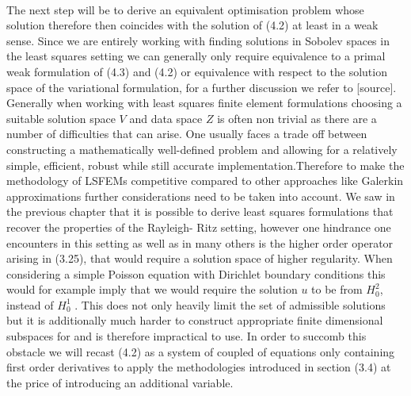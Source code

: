 \documentclass[../draft_1.tex]{subfiles}
\begin{document}
\smallskip
\\
The next step will be to derive an equivalent optimisation problem whose solution therefore then coincides with the solution of (4.2) at least in a weak sense. Since we are entirely working with finding solutions in Sobolev spaces in the least squares setting we can generally only require equivalence to a primal weak formulation of (4.3) and (4.2) or equivalence with respect to the solution space of the variational formulation, for a further discussion we refer to [source]. Generally when working with least squares finite element formulations choosing a suitable solution space $V$ and data space $Z$ is often non trivial as there are a number of difficulties that can arise. One usually faces a trade off between constructing a mathematically well-defined problem and allowing for a relatively simple, efficient, robust while still accurate implementation.Therefore to make the methodology of LSFEMs competitive compared to other approaches like Galerkin approximations further considerations need to be taken into account. We saw in the previous chapter that it is possible to derive least squares formulations that recover the properties of the Rayleigh- Ritz setting, however one hindrance one encounters in this setting as well as in many others is the higher order operator arising in (3.25), that would require a solution space of higher regularity. When considering a simple Poisson equation with Dirichlet boundary conditions this would for example imply that we would require the solution $u$ to be from $H_0^2$, instead of $H_0^1$ \cite{bochev2009least}. This does not only heavily limit the set of admissible solutions but it is additionally much harder to construct appropriate finite dimensional subspaces for and is therefore impractical to use. In order to succomb this obstacle we will recast (4.2) as a system of coupled of equations only containing first order derivatives to apply the methodologies introduced in section (3.4) at the price of introducing an additional variable.
\end{document}
